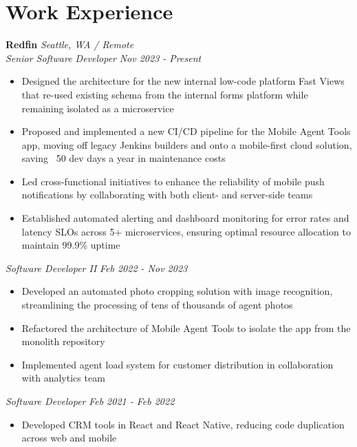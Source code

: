 \documentclass[a4paper,11pt]{article}
\begin{document}
\section{Work Experience}
\vspace{5pt}
\textbf{Redfin} \hspace*{\fill}\emph{Seattle, WA / Remote} \\
\emph{Senior Software Developer} \hspace*{\fill} \emph{Nov 2023 - Present}
\vspace{1.5pt}
\begin{itemize}[noitemsep, topsep=-1ex]
\item Designed the architecture for the new internal low-code platform Fast Views that re-used existing schema from the internal forms platform while remaining isolated as a microservice
\item Proposed and implemented a new CI/CD pipeline for the Mobile Agent Tools app, moving off legacy Jenkins builders and onto a mobile-first cloud solution, saving ~50 dev days a year in maintenance costs
\item Led cross-functional initiatives to enhance the reliability of mobile push notifications by collaborating with both client- and server-side teams
\item Established automated alerting and dashboard monitoring for error rates and latency SLOs across 5+ microservices, ensuring optimal resource allocation to maintain 99.9\% uptime
\end{itemize}
\vspace{1.5pt}
\emph{Software Developer II} \hspace*{\fill} \emph{Feb 2022 - Nov 2023}
\vspace{1.5pt}
\begin{itemize}[noitemsep, topsep=-1ex]
\item Developed an automated photo cropping solution with image recognition, streamlining the processing of tens of thousands of agent photos
\item Refactored the architecture of Mobile Agent Tools to isolate the app from the monolith repository
\item Implemented agent load system for customer distribution in collaboration with analytics team
\end{itemize}
\vspace{1.5pt}
\emph{Software Developer} \hspace*{\fill} \emph{Feb 2021 - Feb 2022}
\vspace{1.5pt}
\begin{itemize}[noitemsep, topsep=-1ex]
\item Developed CRM tools in React and React Native, reducing code duplication across web and mobile
\end{itemize}
\vspace{1.5pt}
\end{document}
